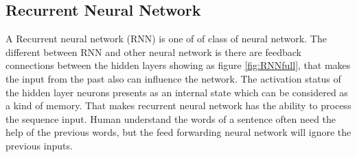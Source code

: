 \subsection{Recurrent Neural Network} %

A Recurrent neural network (RNN) is one of of class of neural network. The different between RNN and other neural network is there are feedback connections between the hidden layers showing as figure \ref{fig:RNNfull}, that makes the input from the past also can influence the network. The activation status of the hidden layer neurons presents as an internal state which can be considered as a kind of memory. That makes recurrent neural network has the ability to process the sequence input. Human understand the words of a sentence often need the help of the previous words, but the feed forwarding neural network will ignore the previous inputs.


